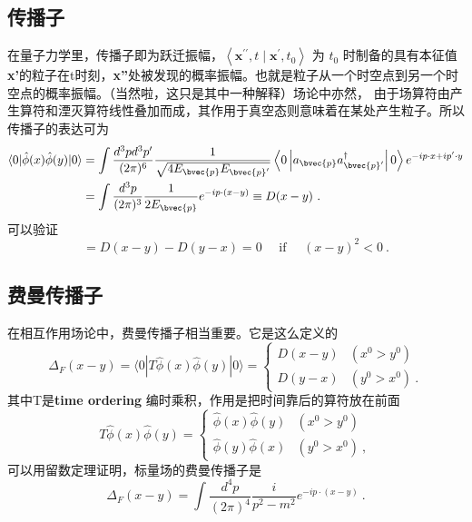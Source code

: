 \subsection{传播子}
在量子力学里，传播子即为跃迁振幅，$\left\langle\mathbf{x}^{\prime \prime}, t \mid \mathbf{x}^{\prime}, t_{0}\right\rangle$ 为 $t_0$ 时制备的具有本征值\textbf{x'}的粒子在t时刻，\textbf{x''}处被发现的概率振幅。也就是粒子从一个时空点到另一个时空点的概率振幅。（当然啦，这只是其中一种解释）场论中亦然，
由于场算符由产生算符和湮灭算符线性叠加而成，其作用于真空态则意味着在某处产生粒子。所以传播子的表达可为
$$\begin{aligned}\langle 0|\hat{\phi}(x) \hat{\phi}(y)| 0\rangle &=\int \frac{d^{3} p d^{3} p^{\prime}}{(2 \pi)^{6}} \frac{1}{\sqrt{4 E_{\bvec{p}} E_{\bvec{p}^{\prime}}}}\left\langle 0\left|a_{\bvec{p}} a_{\bvec{p}^{\prime}}^{\dagger}\right| 0\right\rangle e^{-i p \cdot x+i p^{\prime} \cdot y} \\ &=\int \frac{d^{3} p}{(2 \pi)^{3}} \frac{1}{2 E_{\bvec{p}}} e^{-i p \cdot(x-y)} \equiv D(x-y) ~.\end{aligned}$$
可以验证
\begin{equation}
[\hat{\phi}(x), \hat{\phi}(y)]=D(x-y)-D(y-x)=0 \quad \text { if } \quad(x-y)^{2}<0~.
\end{equation}

\subsection{费曼传播子}
在相互作用场论中，费曼传播子相当重要。它是这么定义的
\begin{equation}
\Delta_{F}(x-y)=\langle 0|T \hat{\phi}(x) \hat{\phi}(y)| 0\rangle=\left\{\begin{array}{ll}
D(x-y) & (x^{0}>y^{0}) \\
D(y-x) & (y^{0}>x^{0})~.
\end{array}\right.
\end{equation}
其中T是\textbf{time ordering} 编时乘积，作用是把时间靠后的算符放在前面
\begin{equation}
T \hat{\phi}(x) \hat{\phi}(y)=\left\{\begin{array}{ll}
\hat{\phi}(x) \hat{\phi}(y) & (x^{0}>y^{0}) \\
\hat{\phi}(y) \hat{\phi}(x) & (y^{0}>x^{0})~,
\end{array}\right.
\end{equation}
可以用留数定理证明，标量场的费曼传播子是
\begin{equation}
\Delta_{F}(x-y)=\int \frac{d^{4} p}{(2 \pi)^{4}} \frac{i}{p^{2}-m^{2}} e^{-i p \cdot(x-y)}~.
\end{equation}

